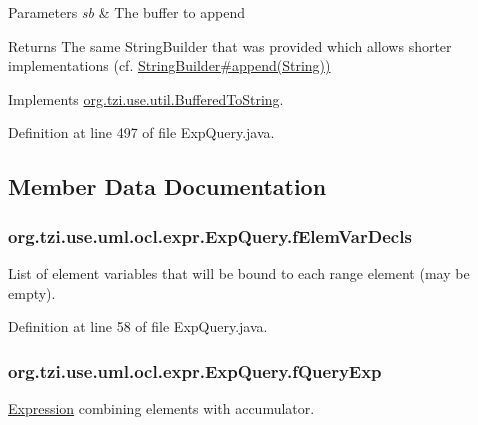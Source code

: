 \begin{DoxyParams}{Parameters}
{\em sb} & The buffer to append \\
\hline
\end{DoxyParams}
\begin{DoxyReturn}{Returns}
The same String\-Builder that was provided which allows shorter implementations (cf. \hyperlink{}{String\-Builder\#append(\-String))} 
\end{DoxyReturn}


Implements \hyperlink{interfaceorg_1_1tzi_1_1use_1_1util_1_1_buffered_to_string_aea95e4e53b18818d50ee253700e6e2d5}{org.\-tzi.\-use.\-util.\-Buffered\-To\-String}.



Definition at line 497 of file Exp\-Query.\-java.



\subsection{Member Data Documentation}
\hypertarget{classorg_1_1tzi_1_1use_1_1uml_1_1ocl_1_1expr_1_1_exp_query_a7e40f4075438ec4592d115c2fe34eb73}{
\subsubsection[{f\-Elem\-Var\-Decls}]{ org.\-tzi.\-use.\-uml.\-ocl.\-expr.\-Exp\-Query.\-f\-Elem\-Var\-Decls\hspace{0.3cm}{\ttfamily [protected]}}}\label{classorg_1_1tzi_1_1use_1_1uml_1_1ocl_1_1expr_1_1_exp_query_a7e40f4075438ec4592d115c2fe34eb73}
List of element variables that will be bound to each range element (may be empty). 

Definition at line 58 of file Exp\-Query.\-java.

\hypertarget{classorg_1_1tzi_1_1use_1_1uml_1_1ocl_1_1expr_1_1_exp_query_ac5a43d4322a25df31d0094249a498b4f}{
\subsubsection[{f\-Query\-Exp}]{ org.\-tzi.\-use.\-uml.\-ocl.\-expr.\-Exp\-Query.\-f\-Query\-Exp\hspace{0.3cm}{\ttfamily [protected]}}}\label{classorg_1_1tzi_1_1use_1_1uml_1_1ocl_1_1expr_1_1_exp_query_ac5a43d4322a25df31d0094249a498b4f}
\hyperlink{classorg_1_1tzi_1_1use_1_1uml_1_1ocl_1_1expr_1_1_expression}{Expression} combining elements with accumulator. 

